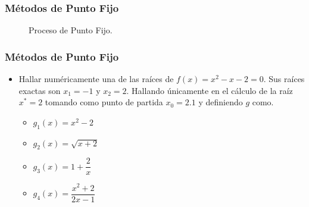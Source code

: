\documentclass{beamer}
\begin{document}
\begin{frame}
  \frametitle{M\'etodos de Punto Fijo}
  \begin{figure}[ht]
  \centering
  \caption{Proceso de Punto Fijo.}
  \end{figure}
\end{frame}
\begin{frame}
  \frametitle{M\'etodos de Punto Fijo}
  \begin{itemize}
    \item Hallar num\'ericamente una de las ra\'ices de $f(x) = x^2 -x-2 = 0$. Sus ra\'ices exactas son $x_1 = -1$ y $x_2 = 2$.
     Hallando \'unicamente en el c\'alculo de la ra\'iz $x^* = 2$ tomando como punto de partida $x_0=2.1$ y definiendo $g$ como.
     \begin{itemize}
      \item $g_1(x) = x^2-2$
      \item $g_2(x) = \sqrt{x+2}$
      \item $g_3(x) = 1+\dfrac{2}{x}$
      \item $g_4(x) = \dfrac{x^2+2}{2x-1}$
     \end{itemize}
  \end{itemize}
\end{frame}
\end{document}
